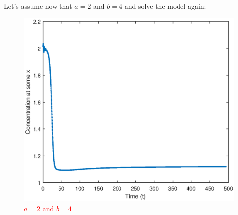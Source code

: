 \documentclass{book}
\theoremstyle{definition}
\begin{document}
Let's assume now that $a = 2$ and $b=4$ and solve the model again:


\begin{figure}[!htb]
	\centering
	\includegraphics[scale=0.6]{Turing_patterns/Turing_3.eps}
	\caption{\textcolor{red}{$a = 2$ and $b=4$}}
	\label{Fig:19}
\end{figure}
\end{document}

